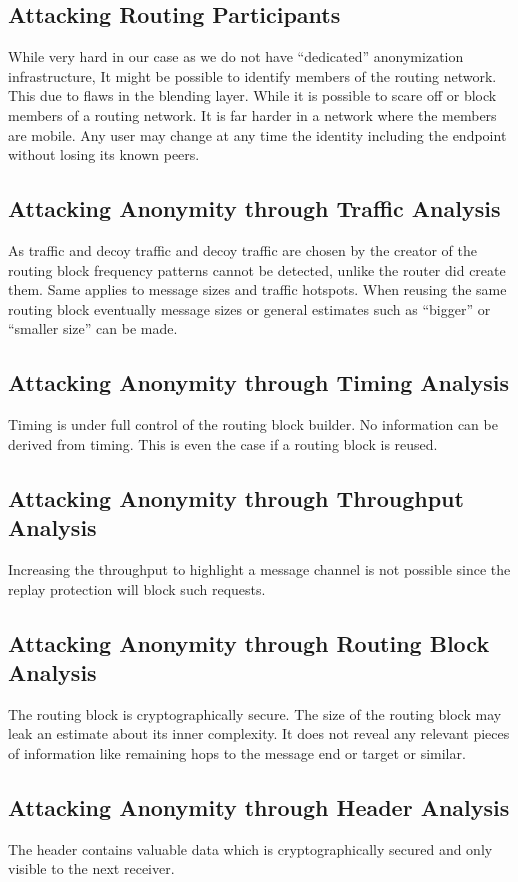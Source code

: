 \subsection{Attacking Routing Participants}
While very hard in our case as we do not have ``dedicated'' anonymization infrastructure, It might be possible to identify members of the routing network. This due to flaws in the blending layer. While it is possible to scare off or block members of a routing network. It is far harder in a network where the members are mobile. Any user may change at any time the identity including the endpoint without losing its known peers.

\subsection{Attacking Anonymity through Traffic Analysis}
As traffic and decoy traffic and decoy traffic are chosen by the creator of the routing block frequency patterns cannot be detected, unlike the router did create them. Same applies to message sizes and traffic hotspots. When reusing the same routing block eventually message sizes or general estimates such as ``bigger'' or ``smaller size'' can be made.

\subsection{Attacking Anonymity through Timing Analysis}
Timing is under full control of the routing block builder. No information can be derived from timing. This is even the case if a routing block is reused.

\subsection{Attacking Anonymity through Throughput Analysis}
Increasing the throughput to highlight a message channel is not possible since the replay protection will block such requests.

\subsection{Attacking Anonymity through Routing Block Analysis}
The routing block is cryptographically secure. The size of the routing block may leak an estimate about its inner complexity. It does not reveal any relevant pieces of information like remaining hops to the message end or target or similar.

\subsection{Attacking Anonymity through Header Analysis}
The header contains valuable data which is cryptographically secured and only visible to the next receiver. 

